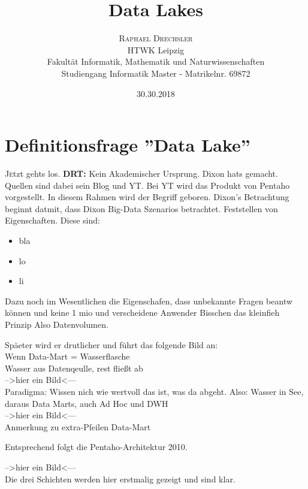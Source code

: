 \documentclass[twoside,twocolumn]{article}
\title{Data Lakes} %
\author{%
\textsc{Raphael Drechsler}\\[1ex] %
\normalsize HTWK Leipzig \\ 
\normalsize Fakultät Informatik, Mathematik und Naturwissenschaften\\ 
\normalsize Studiengang Informatik Master - Matrikelnr. 69872\\%
}
\date{30.30.2018} %
\begin{document}
\maketitle


\section{Definitionsfrage ''Data Lake''}
\lettrine[nindent=0em,lines=2]{J} etzt gehts los.
\textbf{DRT:}
Kein Akademischer Ursprung. Dixon hats gemacht. Quellen sind dabei sein Blog\cite{src5} und YT\cite{src6}. Bei YT wird das Produkt von Pentaho vorgestellt. In diesem Rahmen wird der Begriff geboren.
Dixon's Betrachtung beginnt datmit, dass Dixon Big-Data Szenarios betrachtet. Feststellen von Eigenschaften. Diese sind:
\begin{itemize}
	\item bla
	\item lo
	\item li
\end{itemize}

Dazu noch im Wesentlichen die Eigenschafen, dass unbekannte Fragen beantw können und keine 1 mio und verscheidene Anwender Bisschen das kleinfieh Prinzip
Also Datenvolumen.

Späeter wird er drutlicher und führt das folgende Bild an:\\
Wenn Data-Mart = Wasserflasche\\
Wasser aus Datenqeulle, rest fließt ab \\
-->hier ein Bild<---\cite{src6}\\

Paradigma: Wissen nich wie wertvoll das ist, was da abgeht.
Also: Wasser in See, daraus Data Marts, auch Ad Hoc und DWH\\

-->hier ein Bild<---\cite{src6}\\

Anmerkung zu extra-Pfeilen Data-Mart

Entsprechend folgt die Pentaho-Architektur 2010.

-->hier ein Bild<---\cite{src6}\\
Die drei Schichten werden hier erstmalig gezeigt und sind klar.
\end{document}
